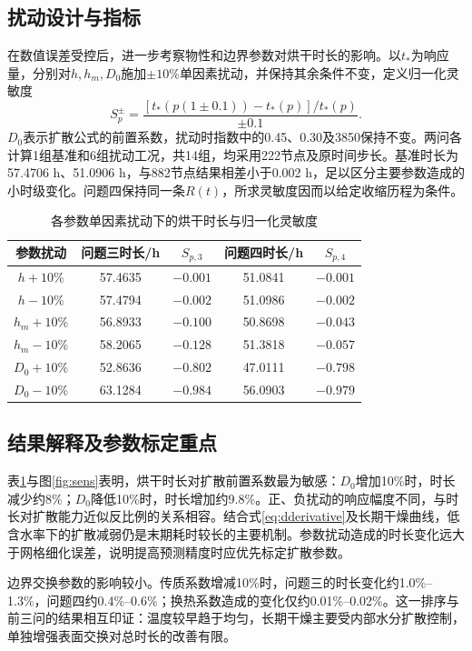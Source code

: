 \subsection{扰动设计与指标}
在数值误差受控后，进一步考察物性和边界参数对烘干时长的影响。以$t_*$为响应量，分别对$h,h_m,D_0$施加$\pm10\%$单因素扰动，并保持其余条件不变，定义归一化灵敏度
\begin{equation}
S_p^{\pm}=\frac{[t_*(p(1\pm0.1))-t_*(p)]/t_*(p)}{\pm0.1}.
\end{equation}
$D_0$表示扩散公式的前置系数，扰动时指数中的0.45、0.30及3850保持不变。两问各计算1组基准和6组扰动工况，共14组，均采用222节点及原时间步长。基准时长为57.4706 h、51.0906 h，与882节点结果相差小于0.002 h，足以区分主要参数造成的小时级变化。问题四保持同一条$R(t)$，所求灵敏度因而以给定收缩历程为条件。
\begin{table}[!htbp]\centering
\caption{各参数单因素扰动下的烘干时长与归一化灵敏度}\label{tab:sens}
\begin{tabular}{ccccc}\toprule
参数扰动&问题三时长/h&$S_{p,3}$&问题四时长/h&$S_{p,4}$\\\midrule
$h+10\%$&57.4635&$-0.001$&51.0841&$-0.001$\\
$h-10\%$&57.4794&$-0.002$&51.0986&$-0.002$\\
$h_m+10\%$&56.8933&$-0.100$&50.8698&$-0.043$\\
$h_m-10\%$&58.2065&$-0.128$&51.3818&$-0.057$\\
$D_0+10\%$&52.8636&$-0.802$&47.0111&$-0.798$\\
$D_0-10\%$&63.1284&$-0.984$&56.0903&$-0.979$\\\bottomrule
\end{tabular}\end{table}

\subsection{结果解释及参数标定重点}
表\ref{tab:sens}与图\ref{fig:sens}表明，烘干时长对扩散前置系数最为敏感：$D_0$增加10\%时，时长减少约8\%；$D_0$降低10\%时，时长增加约9.8\%。正、负扰动的响应幅度不同，与时长对扩散能力近似反比例的关系相容。结合式\eqref{eq:dderivative}及长期干燥曲线，低含水率下的扩散减弱仍是末期耗时较长的主要机制。参数扰动造成的时长变化远大于网格细化误差，说明提高预测精度时应优先标定扩散参数。

边界交换参数的影响较小。传质系数增减10\%时，问题三的时长变化约1.0\%--1.3\%，问题四约0.4\%--0.6\%；换热系数造成的变化仅约0.01\%--0.02\%。这一排序与前三问的结果相互印证：温度较早趋于均匀，长期干燥主要受内部水分扩散控制，单独增强表面交换对总时长的改善有限。

